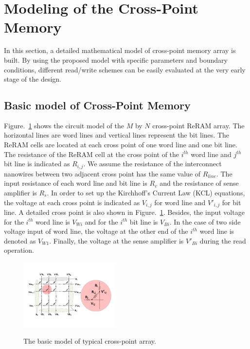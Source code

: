 \vspace{10pt}
\section{Modeling of the Cross-Point Memory}\label{sec:model}

In this section, a detailed mathematical model of cross-point memory array is built. By using the proposed model with specific parameters and
boundary conditions, different read/write schemes can be easily evaluated
at the very early stage of the design.

\subsection{Basic model of Cross-Point Memory}
Figure.~\ref{fig:modeling} shows the circuit model of the $M$ by $N$ cross-point ReRAM array. The horizontal lines are word lines and vertical lines represent the bit lines. The ReRAM cells are located at each cross point of one word line and one bit line. The resistance of the ReRAM cell at the cross point of the $i^{th}$ word line and $j^{th}$ bit line is indicated as $R_{i,j}$. We assume the resistance of the interconnect nanowires between two adjacent cross point has the same value of $R_{line}$. The input resistance of each word line and bit line is $R_v$ and the resistance of sense amplifier is $R_s$. In order to set up the Kirchhoff's Current Law (KCL) equations, the voltage at each cross point is indicated as $V_{i,j}$ for word line and $V'_{i,j}$ for bit line. A detailed cross point is also shown in Figure.~\ref{fig:modeling}. Besides, the input voltage for the $i^{th}$ word line is $V_{Wi}$ and for the $i^{th}$ bit line is $V_{Bi}$. In the case of two side voltage input of word line, the voltage at the other end of the $i^{th}$ word line is denoted as $V_{W1}$. Finally, the voltage at the sense amplifier is $V'_{Bi}$ during the read operation.

\begin{figure}%
\centering
  \includegraphics[width=0.45\textwidth]{./figures/model_reverse.pdf}\\
  \caption{The basic model of typical cross-point array.}\label{fig:modeling}
\end{figure}
